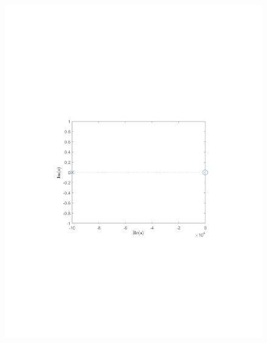 \documentclass[10pt]{article}
\begin{document}
\begin{figure}[ht]
    \centering
    \begin{minipage}[b]{0.45\textwidth}
        \centering
        \includegraphics[clip, trim=4.3cm 8.3cm 4.5cm 9.3cm,width=1\linewidth]{lab1/figs/section7_pole_zero_cs.pdf}
    \end{minipage}
    \begin{minipage}[b]{0.45\textwidth}
        \centering

\end{minipage}
\end{figure}
\end{document}

